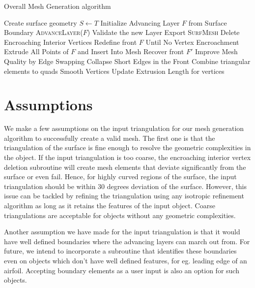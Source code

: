 \documentclass[conf]{new-aiaa}
\begin{document}
\begin{algorithm}[hbt!]
\caption{Overall Mesh Generation algorithm}\label{alg:euclid}
\begin{algorithmic}[1]
\State Create surface geometry $S \gets T$
\State Initialize Advancing Layer $F$ from Surface Boundary
\State \textsc{AdvanceLayer($F$)}
\State Validate the new Layer
\EndWhile \label{advancing-layer-routine}
\State Export \textsc{SurfMesh}
\EndProcedure
{}
\State Delete Encroaching Interior Vertices
\State Redefine front $F$ Until No Vertex Encroachment
\State Extrude All Points of $F$ and Insert Into Mesh
\State Recover front $F'$ 
\State Improve Mesh Quality by Edge Swapping 
\State Collapse Short Edges in the Front
\State Combine triangular elements to quads
\State Smooth Vertices
\State Update Extrusion Length for vertices
\EndProcedure
\end{algorithmic}
\label{algo}
\end{algorithm}

\section{Assumptions}

We make a few assumptions on the input triangulation for our mesh generation algorithm to successfully create a valid mesh. The first one is that the triangulation of the surface is fine enough to resolve the geometric complexities in the object. If the input triangulation is too coarse, the encroaching interior vertex deletion subroutine will create mesh elements that deviate significantly from the surface or even fail. Hence, for highly curved regions of the surface, the input triangulation should be within 30 degrees deviation of the surface. However, this issue can be tackled by refining the triangulation using any isotropic refinement algorithm as long as it retains the features of the input object. Coarse triangulations are acceptable for objects without any geometric complexities.

Another assumption we have made for the input triangulation is that it would have well defined boundaries where the advancing layers can march out from. For future, we intend to incorporate a subroutine that identifies these boundaries even on objects which don't have well defined features, for eg. leading edge of an airfoil. Accepting boundary elements as a user input is also an option for such objects.
\end{document}
